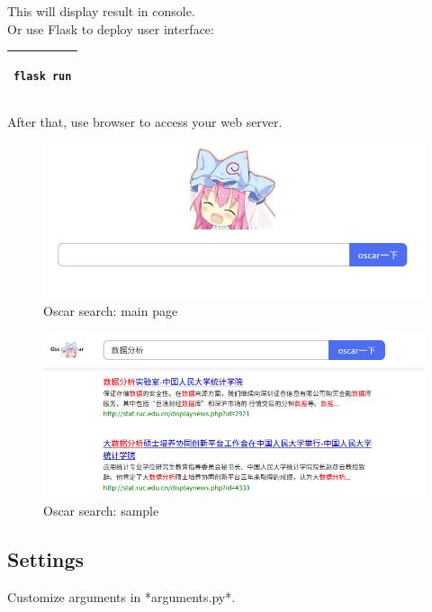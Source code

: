 \documentclass{article}
\begin{document}
This will display result in console.\\

Or use Flask to deploy user interface: \begin{tabular}{|l|}\hline\begin{minipage}[t][1em]{5em}\begin{verbatim}
flask run
\end{verbatim}\end{minipage}\\\hline\end{tabular}

After that, use browser to access your web server.

\begin{figure}[h!]
\centering
\includegraphics[scale=0.5]{1.png}
\caption{Oscar search: main page}
\label{fig:1}
\end{figure}

\newpage

\begin{figure}[h!]
\centering
\includegraphics[scale=0.5]{2.png}
\caption{Oscar search: sample}
\label{fig:2}
\end{figure}

\subsection{Settings}
Customize arguments in *arguments.py*.
\end{document}
